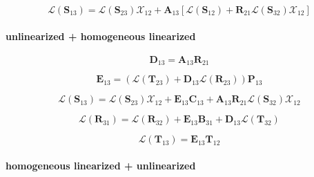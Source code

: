 \begin{equation}
\mathcal{L}(\mathbf{S}_{13}) = \mathcal{L}(\mathbf{S}_{23})\mathcal{X}_{12} + \mathbf{A}_{13}\left[\mathcal{L}(\mathbf{S}_{12}) + \mathbf{R}_{21}\mathcal{L}(\mathbf{S}_{32})\mathcal{X}_{12}\right]
\label{eq:adding-downward-tangent_linear-particular_linearized_p_particular_linearized-V13}
\end{equation}


\paragraph{unlinearized + homogeneous linearized}
\label{sec:adding-downward-tangent_linear-unlinearized_p_homogeneous_linearized}

\begin{equation}
\mathbf{D}_{13} = \mathbf{A}_{13}\mathbf{R}_{21}
\label{eq:adding-downward-tangent_linear-unlinearized_p_homogeneous_linearized-D13}
\end{equation}

\begin{equation}
\mathbf{E}_{13} = (\mathcal{L}(\mathbf{T}_{23}) + \mathbf{D}_{13}\mathcal{L}(\mathbf{R}_{23}))\mathbf{P}_{13}
\label{eq:adding-downward-tangent_linear-unlinearized_p_homogeneous_linearized-E13}
\end{equation}

\begin{equation}
\mathcal{L}(\mathbf{S}_{13}) = \mathcal{L}(\mathbf{S}_{23})\mathcal{X}_{12} + \mathbf{E}_{13}\mathbf{C}_{13} + \mathbf{A}_{13}\mathbf{R}_{21}\mathcal{L}(\mathbf{S}_{32})\mathcal{X}_{12}
\label{eq:adding-downward-tangent_linear-unlinearized_p_homogeneous_linearized-V13}
\end{equation}

\begin{equation}
\mathcal{L}(\mathbf{R}_{31}) = \mathcal{L}(\mathbf{R}_{32}) + \mathbf{E}_{13}\mathbf{B}_{31} + \mathbf{D}_{13}\mathcal{L}(\mathbf{T}_{32})
\label{eq:adding-downward-tangent_linear-unlinearized_p_homogeneous_linearized-U31}
\end{equation}

\begin{equation}
\mathcal{L}(\mathbf{T}_{13}) = \mathbf{E}_{13}\mathbf{T}_{12}
\label{eq:adding-downward-tangent_linear-unlinearized_p_homogeneous_linearized-W13}
\end{equation}


\paragraph{homogeneous linearized + unlinearized}
\label{sec:adding-downward-tangent_linear-homogeneous_linearized_p_unlinearized}

